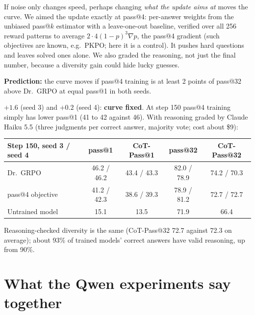 \documentclass[11pt]{article}
\begin{document}
\begin{why}
If noise only changes speed, perhaps changing \emph{what the update aims at} moves the curve. We aimed the update exactly at pass@4: per-answer weights from the unbiased pass@$k$ estimator with a leave-one-out baseline, verified over all 256 reward patterns to average $2\cdot4(1-p)^3\nabla p$, the pass@4 gradient (such objectives are known, e.g.\ PKPO; here it is a control). It pushes hard questions and leaves solved ones alone. We also graded the reasoning, not just the final number, because a diversity gain could hide lucky guesses.
\end{why}
\textbf{Prediction:} the curve moves if pass@4 training is at least 2 points of pass@32 above Dr.\ GRPO at equal pass@1 in both seeds.
\begin{found}
$+1.6$ (seed 3) and $+0.2$ (seed 4): \textbf{curve fixed}. At step 150 pass@4 training simply has lower pass@1 (41 to 42 against 46). With reasoning graded by Claude Haiku 5.5 (three judgments per correct answer, majority vote; cost about \$9):
\begin{center}\small
\begin{tabular}{@{}lcccc@{}}
\toprule
Step 150, seed 3 / seed 4 & pass@1 & CoT-Pass@1 & pass@32 & CoT-Pass@32\\
\midrule
Dr.\ GRPO & 46.2 / 46.2 & 43.4 / 43.3 & 82.0 / 78.9 & 74.2 / 70.3\\
pass@4 objective & 41.2 / 42.3 & 38.6 / 39.3 & 78.9 / 81.2 & 72.7 / 72.7\\
Untrained model & 15.1 & 13.5 & 71.9 & 66.4\\
\bottomrule
\end{tabular}
\end{center}
Reasoning-checked diversity is the same (CoT-Pass@32 72.7 against 72.3 on average); about 93\% of trained models' correct answers have valid reasoning, up from 90\%.
\end{found}

\section{What the Qwen experiments say together}
\end{document}
